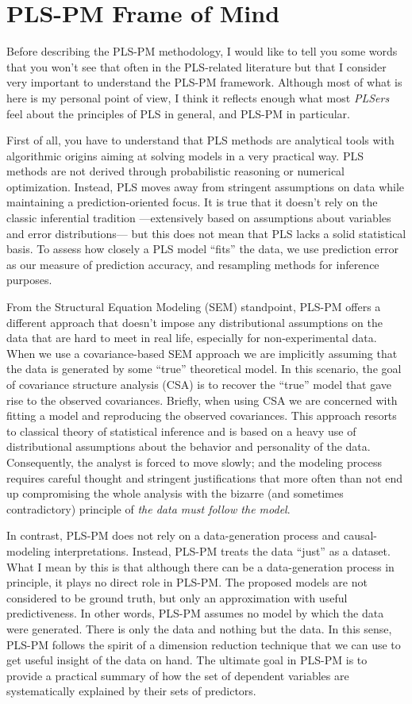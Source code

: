 \documentclass[12pt]{book}\usepackage{graphicx, color}
\begin{document}
\section{PLS-PM Frame of Mind}
Before describing the PLS-PM methodology, I would like to tell you some words that you won't see that often in the PLS-related literature but that I consider very important to understand the PLS-PM framework. Although most of what is here is my personal point of view, I think it reflects enough what most \textit{PLSers} feel about the principles of PLS in general, and PLS-PM in particular.

First of all, you have to understand that PLS methods are analytical tools with algorithmic origins aiming at solving models in a very practical way. PLS methods are not derived through probabilistic reasoning or numerical optimization. Instead, PLS moves away from stringent assumptions on data while maintaining a prediction-oriented focus. It is true that it doesn't rely on the classic inferential tradition ---extensively based on assumptions about variables and error distributions--- but this does not mean that PLS lacks a solid statistical basis. To assess how closely a PLS model ``fits'' the data, we use prediction error as our measure of prediction accuracy, and resampling methods for inference purposes. 

From the Structural Equation Modeling (SEM) standpoint, PLS-PM offers a different approach that doesn't impose any distributional assumptions on the data that are hard to meet in real life, especially for non-experimental data. When we use a covariance-based SEM approach we are implicitly assuming that the data is generated by some ``true'' theoretical model. In this scenario, the goal of covariance structure analysis (CSA) is to recover the ``true'' model that gave rise to the observed covariances. Briefly, when using CSA we are concerned with fitting a model and reproducing the observed covariances. This approach resorts to classical theory of statistical inference and is based on a heavy use of distributional assumptions about the behavior and personality of the data. Consequently, the analyst is forced to move slowly; and the modeling process requires careful thought and stringent justifications that more often than not end up compromising the whole analysis with the bizarre (and sometimes contradictory) principle of \textit{the data must follow the model}. 

In contrast, PLS-PM does not rely on a data-generation process and causal-modeling interpretations. 
Instead, PLS-PM treats the data ``just'' as a dataset. What I mean by this is that although there can be a data-generation process in principle, it plays no direct role in PLS-PM. The proposed models are not considered to be ground truth, but only an approximation with useful predictiveness. In other words, PLS-PM assumes no model by which the data were generated. There is only the data and nothing but the data. In this sense, PLS-PM follows the spirit of a dimension reduction technique that we can use to get useful insight of the data on hand. The ultimate goal in PLS-PM is to provide a practical summary of how the set of dependent variables are systematically explained by their sets of predictors.
\end{document}

